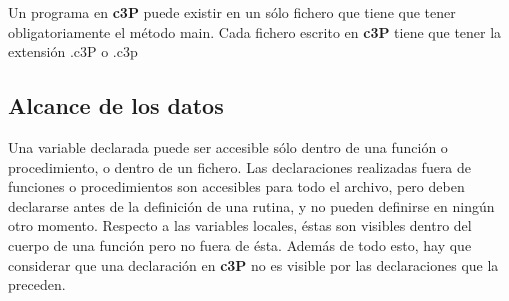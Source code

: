 
Un programa en \textbf{c3P} puede existir en un sólo fichero que tiene que tener
obligatoriamente el método main. Cada fichero escrito en \textbf{c3P} tiene que
tener la extensión .c3P o .c3p

\subsection{Alcance de los datos}

Una variable declarada puede ser accesible sólo dentro de una función o procedimiento,
o dentro de un fichero. Las declaraciones realizadas fuera de funciones o procedimientos
son accesibles para todo el archivo, pero deben declararse antes de la definición de una
rutina, y no pueden definirse en ningún otro momento. Respecto a las variables locales, éstas
son visibles dentro del cuerpo de una función pero no fuera de ésta. Además de todo esto, hay
que considerar que una declaración en \textbf{c3P} no es visible por las declaraciones que la preceden.
